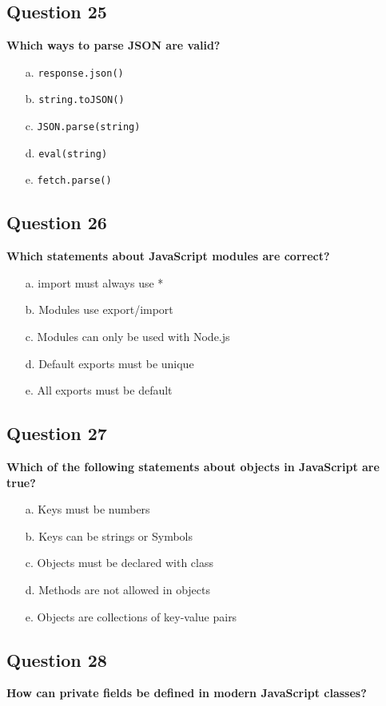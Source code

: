 \documentclass{article}
\begin{document}
\subsection*{Question 25}
\textbf{Which ways to parse JSON are valid?}

\begin{itemize}
  \item[a.] \texttt{response.json()}
  \item[b.] \texttt{string.toJSON()}
  \item[c.] \texttt{JSON.parse(string)}
  \item[d.] \texttt{eval(string)}
  \item[e.] \texttt{fetch.parse()}
\end{itemize}

\subsection*{Question 26}
\textbf{Which statements about JavaScript modules are correct?}

\begin{itemize}
  \item[a.] import must always use *
  \item[b.] Modules use export/import
  \item[c.] Modules can only be used with Node.js
  \item[d.] Default exports must be unique
  \item[e.] All exports must be default
\end{itemize}

\subsection*{Question 27}
\textbf{Which of the following statements about objects in JavaScript are true?}

\begin{itemize}
  \item[a.] Keys must be numbers
  \item[b.] Keys can be strings or Symbols
  \item[c.] Objects must be declared with class
  \item[d.] Methods are not allowed in objects
  \item[e.] Objects are collections of key-value pairs
\end{itemize}

\subsection*{Question 28}
\textbf{How can private fields be defined in modern JavaScript classes?}
\end{document}
